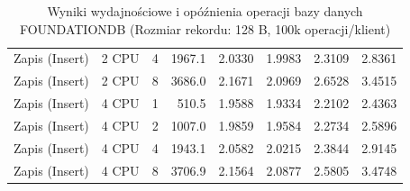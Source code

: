 \begin{table}[ht]
{\begin{tabular}{llcrrrrr}
Zapis (Insert) & 2 CPU & 4 & 1967.1 & 2.0330 & 1.9983 & 2.3109 & 2.8361 \\
Zapis (Insert) & 2 CPU & 8 & 3686.0 & 2.1671 & 2.0969 & 2.6528 & 3.4515 \\
Zapis (Insert) & 4 CPU & 1 & 510.5 & 1.9588 & 1.9334 & 2.2102 & 2.4363 \\
Zapis (Insert) & 4 CPU & 2 & 1007.0 & 1.9859 & 1.9584 & 2.2734 & 2.5896 \\
Zapis (Insert) & 4 CPU & 4 & 1943.1 & 2.0582 & 2.0215 & 2.3844 & 2.9145 \\
Zapis (Insert) & 4 CPU & 8 & 3706.9 & 2.1564 & 2.0877 & 2.5805 & 3.4748 \\
\bottomrule
\end{tabular}%
}
\caption{Wyniki wydajnościowe i opóźnienia operacji bazy danych FOUNDATIONDB (Rozmiar rekordu: 128 B, 100k operacji/klient)}
\label{tab:latency_foundationdb_small_100000}
\end{table}
